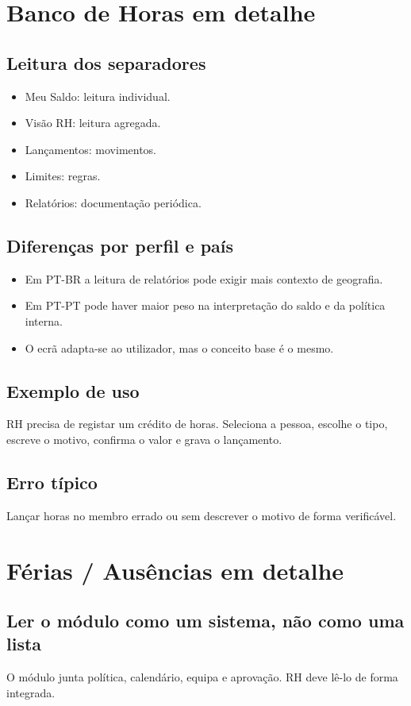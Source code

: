 \section{Banco de Horas em detalhe}
\subsection{Leitura dos separadores}
\begin{itemize}
  \item Meu Saldo: leitura individual.
  \item Visão RH: leitura agregada.
  \item Lançamentos: movimentos.
  \item Limites: regras.
  \item Relatórios: documentação periódica.
\end{itemize}

\subsection{Diferenças por perfil e país}
\begin{itemize}
  \item Em PT-BR a leitura de relatórios pode exigir mais contexto de geografia.
  \item Em PT-PT pode haver maior peso na interpretação do saldo e da política interna.
  \item O ecrã adapta-se ao utilizador, mas o conceito base é o mesmo.
\end{itemize}

\subsection{Exemplo de uso}
RH precisa de registar um crédito de horas. Seleciona a pessoa, escolhe o tipo, escreve o motivo, confirma o valor e grava o lançamento.

\subsection{Erro típico}
Lançar horas no membro errado ou sem descrever o motivo de forma verificável.

\section{Férias / Ausências em detalhe}
\subsection{Ler o módulo como um sistema, não como uma lista}
O módulo junta política, calendário, equipa e aprovação. RH deve lê-lo de forma integrada.

